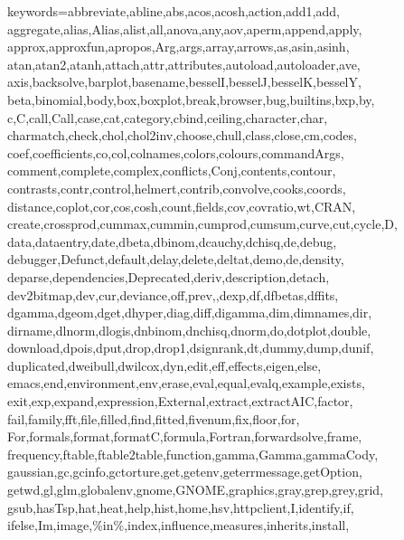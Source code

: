\def\zz{\ifx\[$\else\aftergroup\zzz\fi}
\def\zzz{\setbox0\lastbox
\dimen0\dimexpr\extrarowheight + \ht0-\dp0\relax
\setbox0\hbox{\raise-.5\dimen0\box0}%
\ht0=\dimexpr\ht0+\extrarowheight\relax
\dp0=\dimexpr\dp0+\extrarowheight\relax
\box0
}



%
{keywords={abbreviate,abline,abs,acos,acosh,action,add1,add,%
        aggregate,alias,Alias,alist,all,anova,any,aov,aperm,append,apply,%
        approx,approxfun,apropos,Arg,args,array,arrows,as,asin,asinh,%
        atan,atan2,atanh,attach,attr,attributes,autoload,autoloader,ave,%
        axis,backsolve,barplot,basename,besselI,besselJ,besselK,besselY,%
        beta,binomial,body,box,boxplot,break,browser,bug,builtins,bxp,by,%
        c,C,call,Call,case,cat,category,cbind,ceiling,character,char,%
        charmatch,check,chol,chol2inv,choose,chull,class,close,cm,codes,%
        coef,coefficients,co,col,colnames,colors,colours,commandArgs,%
        comment,complete,complex,conflicts,Conj,contents,contour,%
        contrasts,contr,control,helmert,contrib,convolve,cooks,coords,%
        distance,coplot,cor,cos,cosh,count,fields,cov,covratio,wt,CRAN,%
        create,crossprod,cummax,cummin,cumprod,cumsum,curve,cut,cycle,D,%
        data,dataentry,date,dbeta,dbinom,dcauchy,dchisq,de,debug,%
        debugger,Defunct,default,delay,delete,deltat,demo,de,density,%
        deparse,dependencies,Deprecated,deriv,description,detach,%
        dev2bitmap,dev,cur,deviance,off,prev,,dexp,df,dfbetas,dffits,%
        dgamma,dgeom,dget,dhyper,diag,diff,digamma,dim,dimnames,dir,%
        dirname,dlnorm,dlogis,dnbinom,dnchisq,dnorm,do,dotplot,double,%
        download,dpois,dput,drop,drop1,dsignrank,dt,dummy,dump,dunif,%
        duplicated,dweibull,dwilcox,dyn,edit,eff,effects,eigen,else,%
        emacs,end,environment,env,erase,eval,equal,evalq,example,exists,%
        exit,exp,expand,expression,External,extract,extractAIC,factor,%
        fail,family,fft,file,filled,find,fitted,fivenum,fix,floor,for,%
        For,formals,format,formatC,formula,Fortran,forwardsolve,frame,%
        frequency,ftable,ftable2table,function,gamma,Gamma,gammaCody,%
        gaussian,gc,gcinfo,gctorture,get,getenv,geterrmessage,getOption,%
        getwd,gl,glm,globalenv,gnome,GNOME,graphics,gray,grep,grey,grid,%
        gsub,hasTsp,hat,heat,help,hist,home,hsv,httpclient,I,identify,if,%
        ifelse,Im,image,\%in\%,index,influence,measures,inherits,install,%
}}
